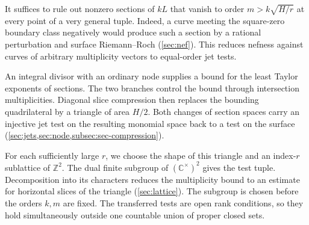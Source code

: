 It suffices to rule out nonzero sections of $kL$ that vanish to order $m>k\sqrt{H/r}$ at every point of a very general tuple. Indeed, a curve meeting the square-zero boundary class negatively would produce such a section by a rational perturbation and surface Riemann--Roch (\cref{sec:nef}). This reduces nefness against curves of arbitrary multiplicity vectors to equal-order jet tests.

An integral divisor with an ordinary node supplies a bound for the least Taylor exponents of sections. The two branches control the bound through intersection multiplicities. Diagonal slice compression then replaces the bounding quadrilateral by a triangle of area $H/2$. Both changes of section spaces carry an injective jet test on the resulting monomial space back to a test on the surface (\cref{sec:jets,sec:node,subsec:sec-compression}).

For each sufficiently large $r$, we choose the shape of this triangle and an index-$r$ sublattice of $\mathbb{Z}^2$. The dual finite subgroup of $(\mathbb{C}^{\times})^2$ gives the test tuple. Decomposition into its characters reduces the multiplicity bound to an estimate for horizontal slices of the triangle (\cref{sec:lattice}). The subgroup is chosen before the orders $k,m$ are fixed. The transferred tests are open rank conditions, so they hold simultaneously outside one countable union of proper closed sets.

